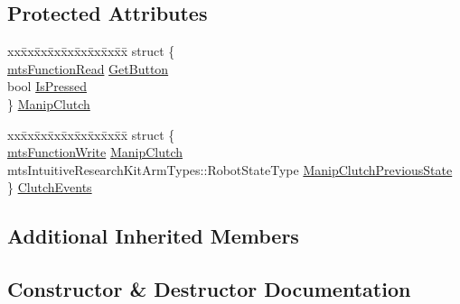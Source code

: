 \subsection*{Protected Attributes}
\begin{DoxyCompactItemize}
\item 
\begin{tabbing}
xx\=xx\=xx\=xx\=xx\=xx\=xx\=xx\=xx\=\kill
struct \{\\
\>\hyperlink{classmts_function_read}{mtsFunctionRead} \hyperlink{classmts_intuitive_research_kit_e_c_m_a544f7f8bbb4ab2a175c35bbb962d6768}{GetButton}\\
\>bool \hyperlink{classmts_intuitive_research_kit_e_c_m_ac3ab65996fefd2e479a066e543696e1c}{IsPressed}\\
\} \hyperlink{classmts_intuitive_research_kit_e_c_m_a466ccb5af2f633318c0eaa9da45fc2a0}{ManipClutch}\\

\end{tabbing}\item 
\begin{tabbing}
xx\=xx\=xx\=xx\=xx\=xx\=xx\=xx\=xx\=\kill
struct \{\\
\>\hyperlink{classmts_function_write}{mtsFunctionWrite} \hyperlink{classmts_intuitive_research_kit_e_c_m_abb5e805cd25cb99784ddf142e0b671c8}{ManipClutch}\\
\>mtsIntuitiveResearchKitArmTypes::RobotStateType \hyperlink{classmts_intuitive_research_kit_e_c_m_a8e17d129e26e3f66c71c4b128f1e8c44}{ManipClutchPreviousState}\\
\} \hyperlink{classmts_intuitive_research_kit_e_c_m_ae0aae8da6e92b5291597d6358647578f}{ClutchEvents}\\

\end{tabbing}\end{DoxyCompactItemize}
\subsection*{Additional Inherited Members}


\subsection{Constructor \& Destructor Documentation}
\hypertarget{classmts_intuitive_research_kit_e_c_m_a0c5ed41167c02448d560e8536f24f29f}{}
